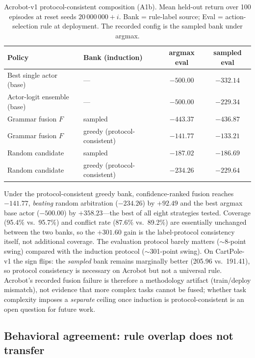 \documentclass[11pt]{article}
\begin{document}
\begin{table}[t]
\centering\small
\caption{Acrobot-v1 protocol-consistent composition (A1b). Mean held-out return over 100 episodes at
reset seeds $20\,000\,000+i$. Bank = rule-label source; Eval = action-selection rule at deployment.
The recorded config is the sampled bank under argmax.}
\label{tab:protocol}
\begin{tabular}{@{}l l c c@{}}
\toprule
Policy & Bank (induction) & argmax eval & sampled eval \\
\midrule
Best single actor (base) & --- & $-500.00$ & $-332.14$ \\
Actor-logit ensemble (base) & --- & $-500.00$ & $-229.34$ \\
Grammar fusion $F$ & sampled & $-443.37$ & $-436.87$ \\
Grammar fusion $F$ & greedy (protocol-consistent) & \textbf{$-141.77$} & $-133.21$ \\
Random candidate & sampled & $-187.02$ & $-186.69$ \\
Random candidate & greedy (protocol-consistent) & $-234.26$ & $-229.64$ \\
\bottomrule
\end{tabular}
\end{table}

Under the protocol-consistent greedy bank, confidence-ranked fusion reaches $-141.77$, \emph{beating}
random arbitration ($-234.26$) by $+92.49$ and the best argmax base actor ($-500.00$) by $+358.23$---the
best of all eight strategies tested. Coverage (95.4\% vs.\ 95.7\%) and conflict rate (87.6\% vs.\ 89.2\%)
are essentially unchanged between the two banks, so the $+301.60$ gain is the label-protocol
consistency itself, not additional coverage. The evaluation protocol barely matters ($\sim$8-point
swing) compared with the induction protocol ($\sim$301-point swing). On CartPole-v1 the sign flips:
the \emph{sampled} bank remains marginally better (205.96 vs.\ 191.41), so protocol consistency is
necessary on Acrobot but not a universal rule. Acrobot's recorded fusion failure is therefore a
methodology artifact (train/deploy mismatch), not evidence that more complex tasks cannot be fused;
whether task complexity imposes a \emph{separate} ceiling once induction is protocol-consistent is an
open question for future work.

\subsection{Behavioral agreement: rule overlap does not transfer}
\label{sec:experiments:agreement}
\end{document}
